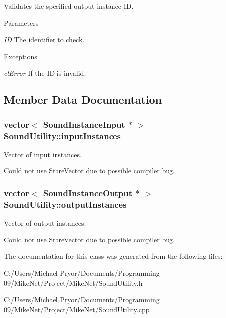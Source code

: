 Validates the specified output instance ID. 


\begin{DoxyParams}{Parameters}
\item[{\em ID}]The identifier to check.\end{DoxyParams}

\begin{DoxyExceptions}{Exceptions}
\item[{\em clError}]If the ID is invalid. \end{DoxyExceptions}


\subsection{Member Data Documentation}
\hypertarget{class_sound_utility_a5fdc769a20a9a49c1c185cb2f7f90c45}{
\subsubsection[{inputInstances}]{\setlength{\rightskip}{0pt plus 5cm}vector$<$ {\bf SoundInstanceInput} $\ast$ $>$ {\bf SoundUtility::inputInstances}}}
\label{class_sound_utility_a5fdc769a20a9a49c1c185cb2f7f90c45}


Vector of input instances. 

Could not use \hyperlink{class_store_vector}{StoreVector} due to possible compiler bug. \hypertarget{class_sound_utility_a015e225d655b6e9607ecc7ec52fa7b39}{
\subsubsection[{outputInstances}]{\setlength{\rightskip}{0pt plus 5cm}vector$<$ {\bf SoundInstanceOutput} $\ast$ $>$ {\bf SoundUtility::outputInstances}}}
\label{class_sound_utility_a015e225d655b6e9607ecc7ec52fa7b39}


Vector of output instances. 

Could not use \hyperlink{class_store_vector}{StoreVector} due to possible compiler bug. 

The documentation for this class was generated from the following files:\begin{DoxyCompactItemize}
\item 
C:/Users/Michael Pryor/Documents/Programming 09/MikeNet/Project/MikeNet/SoundUtility.h\item 
C:/Users/Michael Pryor/Documents/Programming 09/MikeNet/Project/MikeNet/SoundUtility.cpp\end{DoxyCompactItemize}
